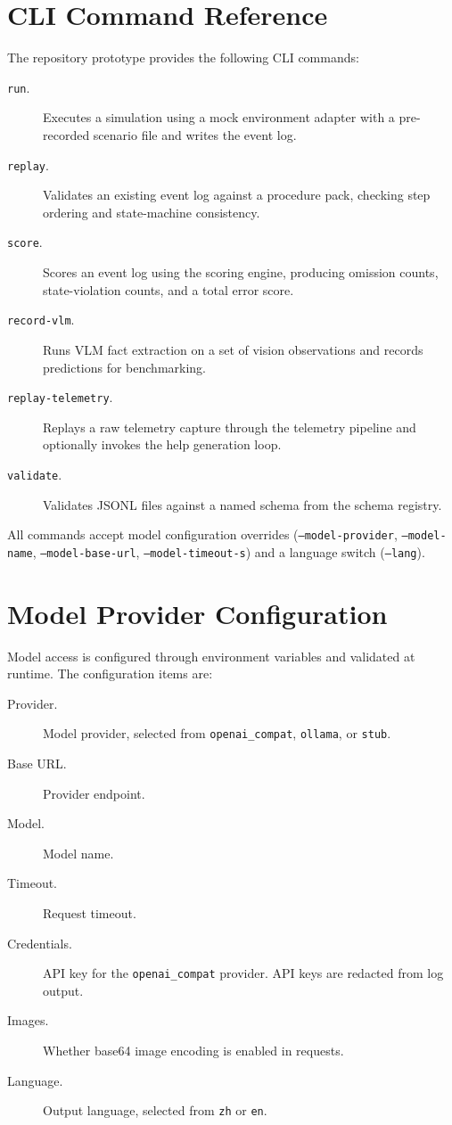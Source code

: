 \section{CLI Command Reference}\label{sec:appendix-cli}

The repository prototype provides the following CLI commands:

\begin{description}
\item[\texttt{run}.] Executes a simulation using a mock environment adapter
with a pre-recorded scenario file and writes the event log.
\item[\texttt{replay}.] Validates an existing event log against a procedure
pack, checking step ordering and state-machine consistency.
\item[\texttt{score}.] Scores an event log using the scoring engine, producing
omission counts, state-violation counts, and a total error score.
\item[\texttt{record-vlm}.] Runs VLM fact extraction on a set of vision
observations and records predictions for benchmarking.
\item[\texttt{replay-telemetry}.] Replays a raw telemetry capture through the
telemetry pipeline and optionally invokes the help generation loop.
\item[\texttt{validate}.] Validates JSONL files against a named schema from
the schema registry.
\end{description}

All commands accept model configuration overrides (\texttt{--model-provider},
\texttt{--model-name}, \texttt{--model-base-url}, \texttt{--model-timeout-s})
and a language switch (\texttt{--lang}).

\section{Model Provider Configuration}\label{sec:appendix-model-config}

Model access is configured through environment variables and validated at
runtime. The configuration items are:

\begin{description}
\item[Provider.] Model provider, selected from \texttt{openai\_compat},
\texttt{ollama}, or \texttt{stub}.
\item[Base URL.] Provider endpoint.
\item[Model.] Model name.
\item[Timeout.] Request timeout.
\item[Credentials.] API key for the \texttt{openai\_compat} provider. API keys
are redacted from log output.
\item[Images.] Whether base64 image encoding is enabled in requests.
\item[Language.] Output language, selected from \texttt{zh} or \texttt{en}.
\end{description}

